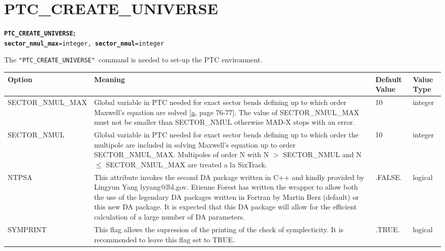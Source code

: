 \section{PTC\_CREATE\_UNIVERSE}

\begin{description}
   \item[Commands] 
   \item
     \texttt{\textbf{\textbf{PTC\_CREATE\_UNIVERSE}}}\textbf{\textbf{;}} \\
     \texttt{\textbf{sector\_nmul\_max}=integer, \textbf{sector\_nmul}=integer}
   \item[Description] 
     The \texttt{"PTC\_CREATE\_UNIVERSE" }command is needed to set-up
     the PTC environment. 
     
   \item[Options]
     \begin{tabular}{l p{6cm} p{1.5cm} p{1.5cm}}
       \hline 
       \textbf{Option} & \textbf{Meaning} & \textbf{Default Value} &
       \textbf{Value Type} \\  
       \hline
       SECTOR\_NMUL\_MAX & Global variable in PTC needed for       exact
       sector bends defining up to which order Maxwell's       equation
       are solved [\hyperlink{E.Forest}{a}, page       76-77]. The value
       of SECTOR\_NMUL\_MAX must not be       smaller than SECTOR\_NMUL
       otherwise MAD-X stops with an       error. & 10 & integer \\  
       \hline
       SECTOR\_NMUL & Global variable in PTC needed for exact sector
       bends defining up to which order the multipole are included in
       solving Maxwell's equation up to order
       SECTOR\_NMUL\_MAX. Multipoles of order N with N $>$ SECTOR\_NMUL
       and N $\leq$ SECTOR\_NMUL\_MAX are treated a la SixTrack. & 10 &
       integer \\  
       \hline
       NTPSA & This attribute invokes the second DA package written in C++ and
       kindly provided by Lingyun Yang  lyyang@lbl.gov. Etienne Forest has
       written the wrapper to allow  both the use of the legendary DA packages
       written in Fortran by  Martin Berz (default) or this new DA package. It
       is expected that this DA package will allow for the efficient
       calculation of a large number of DA parameters. & .FALSE. & logical
       \\   
       \hline
       SYMPRINT & This flag allows the supression of the printing of the
       check of symplecticity. It is recommended to leave this flag set
       to TRUE. & .TRUE. & logical \\  
       \hline
     \end{tabular}
\end{description}


